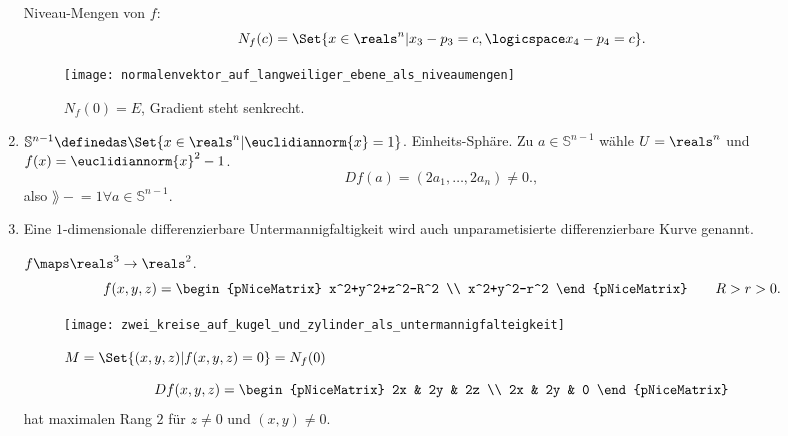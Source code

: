 \begin{beispiele*}
\begin{enumerate}
\begin{figure}[H]
\begin{equation*}
      \end{equation*}
    \end{figure}
    Niveau-Mengen von \( f \):
    \begin{equation*}
      N_f(c)=\Set{x\in \reals^n|x_3-p_3=c,\logicspace x_4-p_4=c}.
    \end{equation*}
    \begin{figure}[H]
      \centering
      \texttt{[image: normalenvektor\_auf\_langweiliger\_ebene\_als\_niveaumengen]}
      \caption*{\( N_f(0)=E \), Gradient steht senkrecht.}
      \label{fig:normalenvektor_auf_langweiliger_ebene_als_niveaumengen}
    \end{figure}
    \item \label{untermannigfaltigkeit:beispiele:sphaere}\( \mathbb{S}^{n-1}\definedas \Set{x\in \reals^n|\euclidiannorm{x}=1} \). Einheits-Sphäre. Zu \( a\in \mathbb{S}^{n-1} \) wähle \( U=\reals^n \) und \( f(x)=\euclidiannorm{x}^2-1 \). 
    \begin{equation*}
      Df(a)=(2a_1,\dotsc,2a_n)\neq 0.,
    \end{equation*}
    also \( \rang-{}=1 \forall a\in \mathbb{S}^{n-1}\).
    \item Eine \( 1 \)-dimensionale differenzierbare Untermannigfaltigkeit wird auch unparametisierte differenzierbare Kurve genannt. 
    \begin{beispiel*}
      \( f\maps \reals^3\to \reals^2 \).
      \begin{equation*}
        f(x,y,z)=\begin{pNiceMatrix} x^2+y^2+z^2-R^2 \\ x^2+y^2-r^2 \end{pNiceMatrix}\qquad R>r>0.
      \end{equation*}
      \begin{figure}[H]
        \centering
        \texttt{[image: zwei\_kreise\_auf\_kugel\_und\_zylinder\_als\_untermannigfalteigkeit]}
        \caption*{\textcolor{red}{\( M=\Set{(x,y,z)|f(x,y,z)=0}=N_f(0) \)}}
        \label{fig:zwei_kreise_auf_kugel_und_zylinder_als_untermannigfalteigkeit}
      \end{figure}
      \begin{equation*}
        Df(x,y,z)=\begin{pNiceMatrix} 2x & 2y & 2z \\ 2x & 2y & 0 \end{pNiceMatrix}
      \end{equation*}
      hat maximalen Rang \( 2 \) für \( z\neq 0 \) und \( (x,y)\neq 0 \).


\end{beispiel*}
\end{enumerate}
\end{beispiele*}
